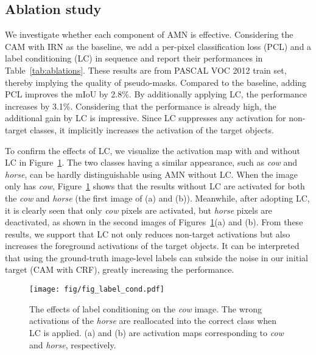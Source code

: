 \documentclass[10pt,twocolumn,letterpaper]{article}
\begin{document}
\subsection{Ablation study}

We investigate whether each component of AMN is effective. Considering the CAM with IRN as the baseline, we add a per-pixel classification loss (PCL) and a label conditioning (LC) in sequence and report their performances in Table~\ref{tab:ablations}. These results are from PASCAL VOC 2012 train set, thereby implying the quality of pseudo-masks. Compared to the baseline, adding PCL improves the mIoU by 2.8\%. By additionally applying LC, the performance increases by 3.1\%. Considering that the performance is already high, the additional gain by LC is impressive. Since LC suppresses any activation for non-target classes, it implicitly increases the activation of the target objects.

To confirm the effects of LC, we visualize the activation map with and without LC in Figure~\ref{fig:label_cond}. The two classes having a similar appearance, such as \textit{cow} and \textit{horse}, can be hardly distinguishable using AMN without LC. When the image only has \textit{cow}, Figure~\ref{fig:label_cond} shows that the results without LC are activated for both the \textit{cow} and \textit{horse} (the first image of (a) and (b)). Meanwhile, after adopting LC, it is clearly seen that only \textit{cow} pixels are activated, but \textit{horse} pixels are deactivated, as shown in the second images of Figures~\ref{fig:label_cond}(a) and (b). From these results, we support that LC not only reduces non-target activations but also increases the foreground activations of the target objects. It can be interpreted that using the ground-truth image-level labels can subside the noise in our initial target (CAM with CRF), greatly increasing the performance.

\begin{figure}[t]
\begin{center}
\texttt{[image: fig/fig\_label\_cond.pdf]}
\end{center}
\vspace{-5mm}
\caption{The effects of label conditioning on the \textit{cow} image. The wrong activations of the \textit{horse} are reallocated into the correct class when LC is applied. (a) and (b) are activation maps corresponding to \textit{cow} and \textit{horse}, respectively.}

\label{fig:label_cond}
\vspace{-5mm}
\end{figure} 
\end{document}
